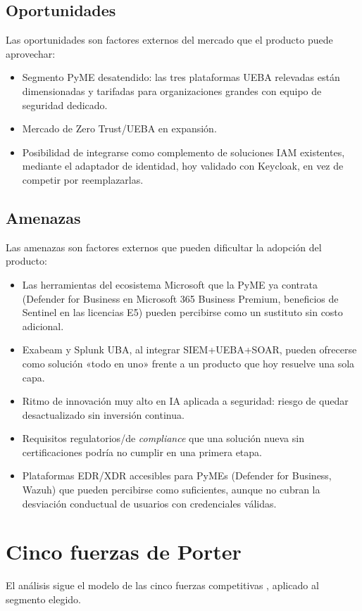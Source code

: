 \subsection{Oportunidades}
Las oportunidades son factores externos del mercado que el producto puede aprovechar:
\begin{itemize}
	\item Segmento PyME desatendido: las tres plataformas UEBA relevadas están dimensionadas y tarifadas para organizaciones grandes con equipo de seguridad dedicado.
	\item Mercado de Zero Trust/UEBA en expansión.
	\item Posibilidad de integrarse como complemento de soluciones IAM existentes, mediante el adaptador de identidad, hoy validado con Keycloak, en vez de competir por reemplazarlas.
\end{itemize}

\subsection{Amenazas}
Las amenazas son factores externos que pueden dificultar la adopción del producto:
\begin{itemize}
	\item Las herramientas del ecosistema Microsoft que la PyME ya contrata (Defender for Business en Microsoft 365 Business Premium, beneficios de Sentinel en las licencias E5) pueden percibirse como un sustituto sin costo adicional.
	\item Exabeam y Splunk UBA, al integrar SIEM+UEBA+SOAR, pueden ofrecerse como solución «todo en uno» frente a un producto que hoy resuelve una sola capa.
	\item Ritmo de innovación muy alto en IA aplicada a seguridad: riesgo de quedar desactualizado sin inversión continua.
	\item Requisitos regulatorios/de \emph{compliance} que una solución nueva sin certificaciones podría no cumplir en una primera etapa.
	\item Plataformas EDR/XDR accesibles para PyMEs (Defender for Business, Wazuh) que pueden percibirse como suficientes, aunque no cubran la desviación conductual de usuarios con credenciales válidas.
\end{itemize}

\section{Cinco fuerzas de Porter}
El análisis sigue el modelo de las cinco fuerzas competitivas \parencite{Porter1979}, aplicado al segmento elegido.

